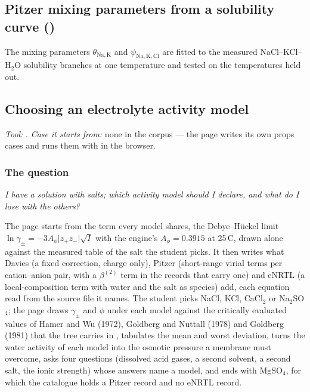 \documentclass[11pt,a4paper]{article}
\begin{document}
\subsection*{Pitzer mixing parameters from a solubility curve \quad()}
The mixing parameters $\theta_{\mathrm{Na,K}}$ and $\psi_{\mathrm{Na,K,Cl}}$
are fitted to the measured NaCl--KCl--H$_2$O solubility branches at one
temperature and tested on the temperatures held out.

\subsection{Choosing an electrolyte activity model}\label{sec:edu-electrolyte-models}

\noindent\textit{\small Tool:} .  \textit{\small
Case it starts from:} none in the corpus --- the page writes its own props
cases and runs them with  in the browser.

\subsubsection*{The question}

\emph{I have a solution with salts; which activity model should I declare,
and what do I lose with the others?}

The page starts from the term every model shares, the Debye--Hückel limit
$\ln\gamma_\pm = -3A_\phi\lvert z_+z_-\rvert\sqrt{I}$ with the engine's
$A_\phi = 0.3915$ at 25\,\textdegree C, drawn alone against the measured table
of the salt the student picks.  It then writes what Davies (a fixed correction,
charge only), Pitzer (short-range virial terms per cation--anion pair, with a $\beta^{(2)}$ term in the records that carry one) and
eNRTL (a local-composition term with water and the salt as species) add, each
equation read from the source file it names.  The student picks NaCl, KCl,
CaCl$_2$ or Na$_2$SO$_4$; the page draws $\gamma_\pm$ and $\phi$ under each
model against the critically evaluated values of Hamer and Wu (1972),
Goldberg and Nuttall (1978) and Goldberg (1981) that the tree carries in
, tabulates the mean and worst deviation,
turns the water activity of each model into the osmotic pressure a membrane
must overcome, asks four questions (dissolved acid gases, a second solvent, a
second salt, the ionic strength) whose answers name a model, and ends with
MgSO$_4$, for which the catalogue holds a Pitzer record and no eNRTL record.
\end{document}
